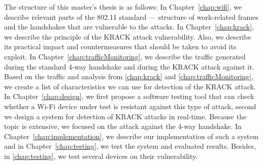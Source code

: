 The structure of this master’s thesis is as follows: In Chapter~\ref{chap:wifi}, we describe relevant parts of the 802.11 standard --- structure of work-related frames and the handshakes that are vulnerable to the attacks. In Chapter~\ref{chap:krack}, we describe the principle of the KRACK attack vulnerability. Also, we describe its practical impact and countermeasures that should be taken to avoid its exploit. In Chapter~\ref{chap:trafficMonitoring}, we describe the traffic generated during the standard 4-way handshake and during the KRACK attack against it. Based on the traffic and analysis from \ref{chap:krack} and \ref{chap:trafficMonitoring}, we create a list of characteristics we can use for detection of the KRACK attack. In Chapter~\ref{chap:design}, we first propose a software testing tool that can check whether a Wi-Fi device under test is resistant against this type of attack, second we design a system for detection of KRACK attacks in real-time. Because the topic is extensive, we focused on the attack against the 4-way handshake. In Chapter~\ref{chap:implementation}, we describe our implementation of such a system and in Chapter~\ref{chap:testing}, we test the system and evaluated results. Besides, in \ref{chap:testing}, we test several devices on their vulnerability.